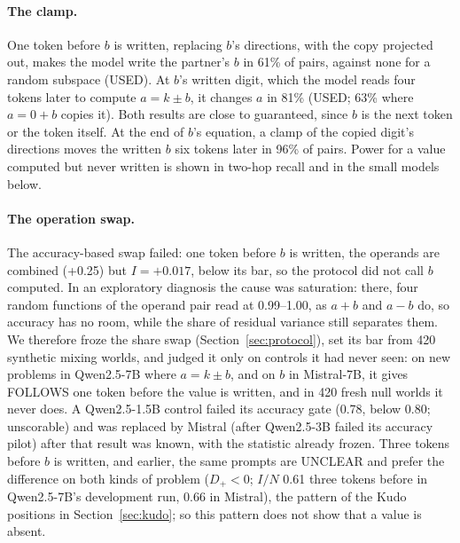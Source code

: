 \documentclass{article}
\begin{document}
\paragraph{The clamp.} One token before $b$ is written, replacing $b$'s directions, with the copy projected out, makes the model write the partner's $b$ in 61\% of pairs, against none for a random subspace (USED). At $b$'s written digit, which the model reads four tokens later to compute $a = k \pm b$, it changes $a$ in 81\% (USED; 63\% where $a = 0 + b$ copies it). Both results are close to guaranteed, since $b$ is the next token or the token itself. At the end of $b$'s equation, a clamp of the copied digit's directions moves the written $b$ six tokens later in 96\% of pairs. Power for a value computed but never written is shown in two-hop recall and in the small models below.

\paragraph{The operation swap.} The accuracy-based swap failed: one token before $b$ is written, the operands are combined (+0.25) but $I = +0.017$, below its bar, so the protocol did not call $b$ computed. In an exploratory diagnosis the cause was saturation: there, four random functions of the operand pair read at 0.99--1.00, as $a+b$ and $a-b$ do, so accuracy has no room, while the share of residual variance still separates them. We therefore froze the share swap (Section~\ref{sec:protocol}), set its bar from 420 synthetic mixing worlds, and judged it only on controls it had never seen: on new problems in Qwen2.5-7B where $a = k \pm b$, and on $b$ in Mistral-7B, it gives FOLLOWS one token before the value is written, and in 420 fresh null worlds it never does. A Qwen2.5-1.5B control failed its accuracy gate (0.78, below 0.80; unscorable) and was replaced by Mistral (after Qwen2.5-3B failed its accuracy pilot) after that result was known, with the statistic already frozen. Three tokens before $b$ is written, and earlier, the same prompts are UNCLEAR and prefer the difference on both kinds of problem ($D_+ < 0$; $I/N$ 0.61 three tokens before in Qwen2.5-7B's development run, 0.66 in Mistral), the pattern of the Kudo positions in Section~\ref{sec:kudo}; so this pattern does not show that a value is absent.
\end{document}
